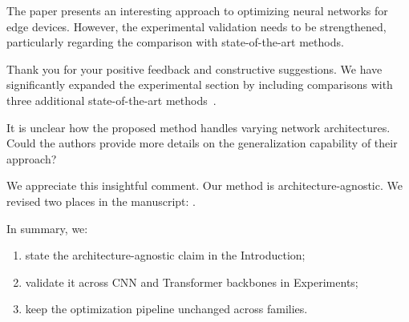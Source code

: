 \documentclass{ar2rc}
\begin{document}
\resetcommentcounter

\begin{generalblock}
\begin{generalcomment}
  \label{com1.0}
  The paper presents an interesting approach to optimizing neural networks for
  edge devices. However, the experimental validation needs to be strengthened,
  particularly regarding the comparison with state-of-the-art methods.
\end{generalcomment}
\begin{generalresponse}
  Thank you for your positive feedback and constructive suggestions. We have
  significantly expanded the experimental section by including comparisons with
  three additional state-of-the-art methods~\cite{EtAlForever2020}.
\end{generalresponse}
\end{generalblock}

\begin{reviewerblock}
\begin{reviewercomment}
\label{com1.1}
  It is unclear how the proposed method handles varying network architectures.
  Could the authors provide more details on the generalization capability of
  their approach?
\end{reviewercomment}
\begin{reviewerresponse}
  We appreciate this insightful comment. Our method is architecture-agnostic.
  We revised two places in the manuscript: .


  In summary, we:
  \begin{enumerate}
    \item state the architecture-agnostic claim in the Introduction;
    \item validate it across CNN and Transformer backbones in Experiments;
    \item keep the optimization pipeline unchanged across families.
  \end{enumerate}
\end{reviewerresponse}
\end{reviewerblock}
\end{document}
